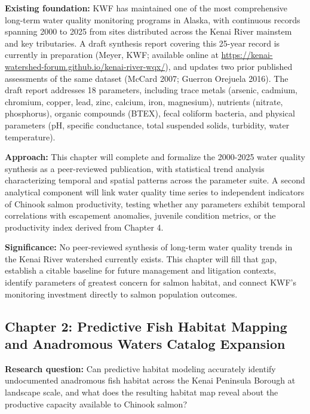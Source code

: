 \documentclass[
  letterpaper,
  DIV=11,
  numbers=noendperiod]{scrreprt}
\begin{document}
\textbf{Existing foundation:} KWF has maintained one of the most
comprehensive long-term water quality monitoring programs in Alaska,
with continuous records spanning 2000 to 2025 from sites distributed
across the Kenai River mainstem and key tributaries. A draft synthesis
report covering this 25-year record is currently in preparation (Meyer,
KWF; available online at
\url{https://kenai-watershed-forum.github.io/kenai-river-wqx/}), and
updates two prior published assessments of the same dataset (McCard
2007; Guerron Orejuela 2016). The draft report addresses 18 parameters,
including trace metals (arsenic, cadmium, chromium, copper, lead, zinc,
calcium, iron, magnesium), nutrients (nitrate, phosphorus), organic
compounds (BTEX), fecal coliform bacteria, and physical parameters (pH,
specific conductance, total suspended solids, turbidity, water
temperature).

\textbf{Approach:} This chapter will complete and formalize the
2000-2025 water quality synthesis as a peer-reviewed publication, with
statistical trend analysis characterizing temporal and spatial patterns
across the parameter suite. A second analytical component will link
water quality time series to independent indicators of Chinook salmon
productivity, testing whether any parameters exhibit temporal
correlations with escapement anomalies, juvenile condition metrics, or
the productivity index derived from Chapter 4.

\textbf{Significance:} No peer-reviewed synthesis of long-term water
quality trends in the Kenai River watershed currently exists. This
chapter will fill that gap, establish a citable baseline for future
management and litigation contexts, identify parameters of greatest
concern for salmon habitat, and connect KWF's monitoring investment
directly to salmon population outcomes.

\subsection{Chapter 2: Predictive Fish Habitat Mapping and Anadromous
Waters Catalog
Expansion}\label{chapter-2-predictive-fish-habitat-mapping-and-anadromous-waters-catalog-expansion}

\textbf{Research question:} Can predictive habitat modeling accurately
identify undocumented anadromous fish habitat across the Kenai Peninsula
Borough at landscape scale, and what does the resulting habitat map
reveal about the productive capacity available to Chinook salmon?
\end{document}

